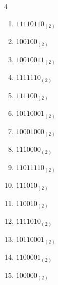 \begin{multicols}{4}
\begin{enumerate}
        \phantom{$=209$}

  \item $11110110_{(2)}$

        \phantom{$=246$}

\columnbreak %

  \item $100100_{(2)}$

        \phantom{$=36$}

  \item $10010011_{(2)}$

        \phantom{$=147$}

  \item $1111110_{(2)}$

        \phantom{$=126$}

  \item $111100_{(2)}$

        \phantom{$=60$}

  \item $10110001_{(2)}$

        \phantom{$=177$}

  \item $10001000_{(2)}$

        \phantom{$=136$}

  \item $1110000_{(2)}$

        \phantom{$=112$}

  \item $11011110_{(2)}$

        \phantom{$=222$}

  \item $111010_{(2)}$

        \phantom{$=58$}

  \item $110010_{(2)}$

        \phantom{$=50$}

  \item $1111010_{(2)}$

        \phantom{$=122$}

  \item $10110001_{(2)}$

        \phantom{$=177$}

  \item $1100001_{(2)}$

        \phantom{$=97$}

  \item $100000_{(2)}$


\end{enumerate}
\end{multicols}
